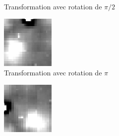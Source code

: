\documentclass[a4paper, 12pt, titlepage, oneside, french]{article}
\begin{document}
\begin{figure}[H]
\begin{subfigure}[t]{0.3\linewidth}
			\caption{Transformation avec rotation de $\pi/2$}
		\end{subfigure}
		\begin{subfigure}[t]{0.3\linewidth}
			\includegraphics[width=\linewidth]{Exemple180.png}
			\caption{Transformation avec rotation de $\pi$}
		\end{subfigure}
		\begin{subfigure}[t]{0.3\linewidth}
			\includegraphics[width=\linewidth]{Exemple270.png}

\end{subfigure}
\end{figure}
\end{document}
